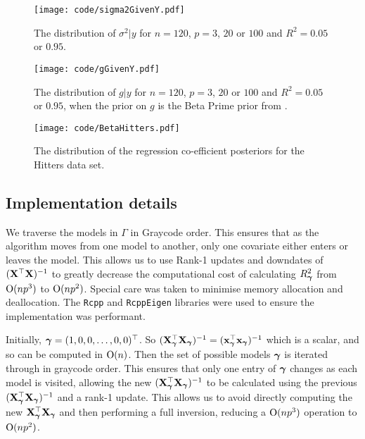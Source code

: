 \begin{figure}
	\texttt{[image: code/sigma2GivenY.pdf]}
	\label{fig:sigma2GivenY}
	\caption{The distribution of $\sigma^2 | y$ for $n = 120$, $p = 3$, $20$ or $100$ and $R^2 = 0.05$ or $0.95$.}
\end{figure}

\begin{figure}
	\texttt{[image: code/gGivenY.pdf]}
	\label{fig:gGivenY}
	\caption{The distribution of $g | y$ for $n = 120$, $p = 3$, $20$ or $100$ and $R^2 = 0.05$ or $0.95$,
					 when the prior on $g$ is the Beta Prime prior from \citep{Maruyama2011}.}
\end{figure}

\begin{figure}
	\texttt{[image: code/BetaHitters.pdf]}
	\label{fig:BetaHitters}
	\caption{The distribution of the regression co-efficient posteriors for the Hitters data set.}
\end{figure}


\subsection{Implementation details}
\label{sec:implementation}

We traverse the models in $\Gamma$ in Graycode order.
This ensures that as the algorithm moves from one model to another, only one covariate either enters or leaves
the model.
This allows us to use Rank-1 updates and downdates of $({\bf X}^\top {\bf X})^{-1}$ to greatly decrease the
computational cost of calculating $R_{\boldsymbol \gamma}^2$ from $\text{O}(np^3)$ to $\text{O}(np^2)$.
Special care was taken to minimise memory allocation and deallocation.
The \texttt{Rcpp} and \texttt{RcppEigen} libraries were used to ensure the implementation was performant.

Initially, ${\boldsymbol \gamma} = (1, 0, 0, \ldots, 0, 0)^\top$. So $({\bf X}_{\boldsymbol \gamma}^\top {\bf X}_{\boldsymbol \gamma})^{-1} =
({\bf x}_{\boldsymbol \gamma}^\top {\bf x}_{\boldsymbol \gamma})^{-1}$ which is a scalar, and so can be computed in $\text{O}(n)$. Then the set of
possible models ${\boldsymbol \gamma}$ is iterated through in graycode order. This ensures that only one entry of ${\boldsymbol \gamma}$
changes as each model is visited, allowing the new $({\bf X}_{\boldsymbol \gamma}^\top {\bf X}_{\boldsymbol \gamma})^{-1}$ to be calculated
using the previous $({\bf X}_{\boldsymbol \gamma}^\top {\bf X}_{\boldsymbol \gamma})^{-1}$ and a rank-1 update. This allows us to avoid directly
computing the new ${\bf X}_{\boldsymbol \gamma}^\top {\bf X}_{\boldsymbol \gamma}$ and then performing a full inversion, reducing a $\text{O}(n
p^3)$ operation to $\text{O}(n p^2)$.

